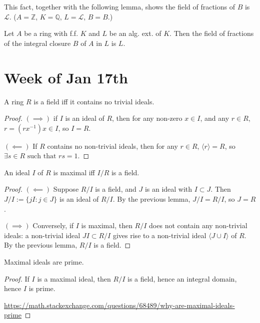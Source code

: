 This fact, together with the following lemma, shows the field of fractions of $B$ is $\mathcal{L}$. ($A=\mathbb{Z}$, $K=\mathbb{Q}$, $L=\mathcal{L}$, $B=B$.)
\begin{lemma}
Let $A$ be a ring with f.f. $K$ and $L$ be an alg. ext. of $K$. Then the field of fractions of the integral closure $B$ of $A$ in $L$ is $L$.
\end{lemma}

\section{Week of Jan 17th}

\begin{lemma}
A ring $R$ is a field iff it contains no trivial ideals.
\end{lemma}
\begin{proof}
$(\implies)$ if $I$ is an ideal of $R$, then for any non-zero $x\in I$, and any $r\in R$, $r=(rx^{-1})x\in I$, so $I=R$.

$(\impliedby)$ If $R$ contains no non-trivial ideals, then for any $r\in R$, $\langle r\rangle =R$, so $\exists s\in R \text{ such that } rs=1$.
\end{proof}

\begin{lemma}
An ideal $I$ of $R$ is maximal iff $I/R$ is a field.
\end{lemma}
\begin{proof}
$(\impliedby)$ Suppose $R/I$ is a field, and $J$  is an ideal with $I\subset J$. Then $J/I:=\{jI: j\in J\}$ is an ideal of $R/I$. By the previous lemma, $J/I=R/I$, so $J=R$.

$(\implies)$ Conversely, if $I$ is maximal, then $R/I$ does not contain any non-trivial ideals: a non-trivial ideal $JI\subset R/I$ gives rise to a non-trivial ideal $\langle J\cup I\rangle$ of $R$. By the previous lemma, $R/I$ is a field.
\end{proof}

\begin{corollary}
Maximal ideals are prime.
\end{corollary}
\begin{proof}
If $I$ is a maximal ideal, then $R/I$ is a field, hence an integral domain, hence $I$ is prime.

\url{https://math.stackexchange.com/questions/68489/why-are-maximal-ideals-prime}
\end{proof}